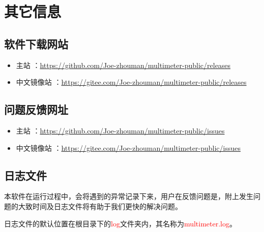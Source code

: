 \chapter{其它信息}

\section{软件下载网站}

\begin{itemize}
    \item 主站 ：\href{https://github.com/Joe-zhouman/multimeter-public/releases}{https://github.com/Joe-zhouman/multimeter-public/releases}  
    \item 中文镜像站 ：\href{https://gitee.com/Joe-zhouman/multimeter-public/releases}{https://gitee.com/Joe-zhouman/multimeter-public/releases}  
\end{itemize}

\section{问题反馈网址}

\begin{itemize}
    \item 主站 ：\href{https://github.com/Joe-zhouman/multimeter-public/issues}{https://github.com/Joe-zhouman/multimeter-public/issues}  
    \item 中文镜像站 ：\href{https://gitee.com/Joe-zhouman/multimeter-public/issues}{https://gitee.com/Joe-zhouman/multimeter-public/issues}  
\end{itemize}

\section{日志文件}
本软件在运行过程中，会将遇到的异常记录下来，用户在反馈问题是，附上发生问题的大致时间及日志文件将有助于我们更快的解决问题。

日志文件的默认位置在根目录下的\textcolor{red}{log}文件夹内，其名称为\textcolor{red}{multimeter.log}。